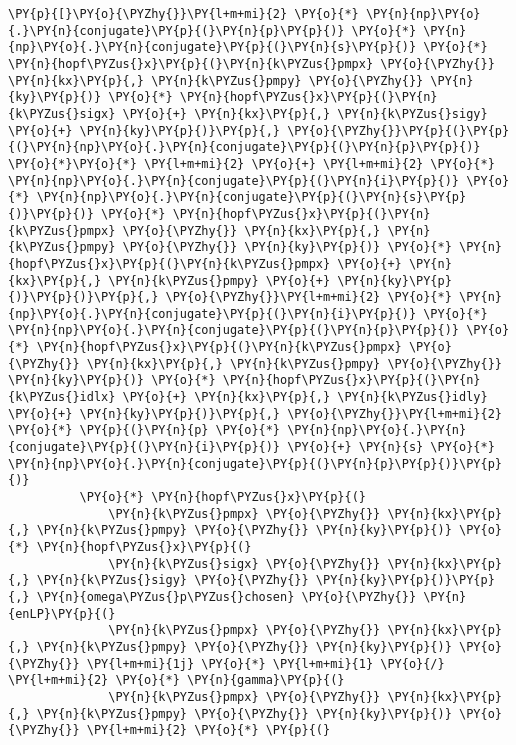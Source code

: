 \begin{Verbatim}[commandchars=\\\{\}]
         \PY{p}{[}\PY{o}{\PYZhy{}}\PY{l+m+mi}{2} \PY{o}{*} \PY{n}{np}\PY{o}{.}\PY{n}{conjugate}\PY{p}{(}\PY{n}{p}\PY{p}{)} \PY{o}{*} \PY{n}{np}\PY{o}{.}\PY{n}{conjugate}\PY{p}{(}\PY{n}{s}\PY{p}{)} \PY{o}{*} \PY{n}{hopf\PYZus{}x}\PY{p}{(}\PY{n}{k\PYZus{}pmpx} \PY{o}{\PYZhy{}} \PY{n}{kx}\PY{p}{,} \PY{n}{k\PYZus{}pmpy} \PY{o}{\PYZhy{}} \PY{n}{ky}\PY{p}{)} \PY{o}{*} \PY{n}{hopf\PYZus{}x}\PY{p}{(}\PY{n}{k\PYZus{}sigx} \PY{o}{+} \PY{n}{kx}\PY{p}{,} \PY{n}{k\PYZus{}sigy} \PY{o}{+} \PY{n}{ky}\PY{p}{)}\PY{p}{,} \PY{o}{\PYZhy{}}\PY{p}{(}\PY{p}{(}\PY{n}{np}\PY{o}{.}\PY{n}{conjugate}\PY{p}{(}\PY{n}{p}\PY{p}{)} \PY{o}{*}\PY{o}{*} \PY{l+m+mi}{2} \PY{o}{+} \PY{l+m+mi}{2} \PY{o}{*} \PY{n}{np}\PY{o}{.}\PY{n}{conjugate}\PY{p}{(}\PY{n}{i}\PY{p}{)} \PY{o}{*} \PY{n}{np}\PY{o}{.}\PY{n}{conjugate}\PY{p}{(}\PY{n}{s}\PY{p}{)}\PY{p}{)} \PY{o}{*} \PY{n}{hopf\PYZus{}x}\PY{p}{(}\PY{n}{k\PYZus{}pmpx} \PY{o}{\PYZhy{}} \PY{n}{kx}\PY{p}{,} \PY{n}{k\PYZus{}pmpy} \PY{o}{\PYZhy{}} \PY{n}{ky}\PY{p}{)} \PY{o}{*} \PY{n}{hopf\PYZus{}x}\PY{p}{(}\PY{n}{k\PYZus{}pmpx} \PY{o}{+} \PY{n}{kx}\PY{p}{,} \PY{n}{k\PYZus{}pmpy} \PY{o}{+} \PY{n}{ky}\PY{p}{)}\PY{p}{)}\PY{p}{,} \PY{o}{\PYZhy{}}\PY{l+m+mi}{2} \PY{o}{*} \PY{n}{np}\PY{o}{.}\PY{n}{conjugate}\PY{p}{(}\PY{n}{i}\PY{p}{)} \PY{o}{*} \PY{n}{np}\PY{o}{.}\PY{n}{conjugate}\PY{p}{(}\PY{n}{p}\PY{p}{)} \PY{o}{*} \PY{n}{hopf\PYZus{}x}\PY{p}{(}\PY{n}{k\PYZus{}pmpx} \PY{o}{\PYZhy{}} \PY{n}{kx}\PY{p}{,} \PY{n}{k\PYZus{}pmpy} \PY{o}{\PYZhy{}} \PY{n}{ky}\PY{p}{)} \PY{o}{*} \PY{n}{hopf\PYZus{}x}\PY{p}{(}\PY{n}{k\PYZus{}idlx} \PY{o}{+} \PY{n}{kx}\PY{p}{,} \PY{n}{k\PYZus{}idly} \PY{o}{+} \PY{n}{ky}\PY{p}{)}\PY{p}{,} \PY{o}{\PYZhy{}}\PY{l+m+mi}{2} \PY{o}{*} \PY{p}{(}\PY{n}{p} \PY{o}{*} \PY{n}{np}\PY{o}{.}\PY{n}{conjugate}\PY{p}{(}\PY{n}{i}\PY{p}{)} \PY{o}{+} \PY{n}{s} \PY{o}{*} \PY{n}{np}\PY{o}{.}\PY{n}{conjugate}\PY{p}{(}\PY{n}{p}\PY{p}{)}\PY{p}{)}
          \PY{o}{*} \PY{n}{hopf\PYZus{}x}\PY{p}{(}
              \PY{n}{k\PYZus{}pmpx} \PY{o}{\PYZhy{}} \PY{n}{kx}\PY{p}{,} \PY{n}{k\PYZus{}pmpy} \PY{o}{\PYZhy{}} \PY{n}{ky}\PY{p}{)} \PY{o}{*} \PY{n}{hopf\PYZus{}x}\PY{p}{(}
              \PY{n}{k\PYZus{}sigx} \PY{o}{\PYZhy{}} \PY{n}{kx}\PY{p}{,} \PY{n}{k\PYZus{}sigy} \PY{o}{\PYZhy{}} \PY{n}{ky}\PY{p}{)}\PY{p}{,} \PY{n}{omega\PYZus{}p\PYZus{}chosen} \PY{o}{\PYZhy{}} \PY{n}{enLP}\PY{p}{(}
              \PY{n}{k\PYZus{}pmpx} \PY{o}{\PYZhy{}} \PY{n}{kx}\PY{p}{,} \PY{n}{k\PYZus{}pmpy} \PY{o}{\PYZhy{}} \PY{n}{ky}\PY{p}{)} \PY{o}{\PYZhy{}} \PY{l+m+mi}{1j} \PY{o}{*} \PY{l+m+mi}{1} \PY{o}{/} \PY{l+m+mi}{2} \PY{o}{*} \PY{n}{gamma}\PY{p}{(}
              \PY{n}{k\PYZus{}pmpx} \PY{o}{\PYZhy{}} \PY{n}{kx}\PY{p}{,} \PY{n}{k\PYZus{}pmpy} \PY{o}{\PYZhy{}} \PY{n}{ky}\PY{p}{)} \PY{o}{\PYZhy{}} \PY{l+m+mi}{2} \PY{o}{*} \PY{p}{(}

\end{Verbatim}
